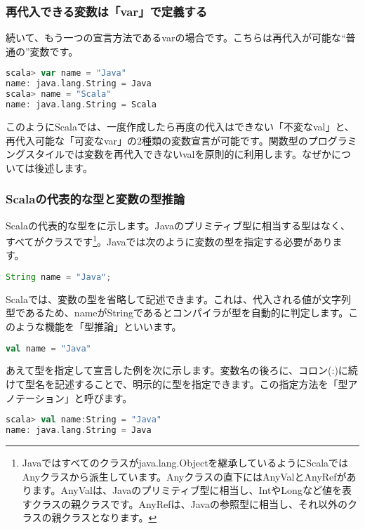 \subsubsection{再代入できる変数は「var」で定義する}
続いて、もう一つの宣言方法であるvarの場合です。こちらは再代入が可能な“普通の”変数です。

\begin{lstlisting}[language=scala, frame=none]
scala> var name = "Java"
name: java.lang.String = Java
scala> name = "Scala"
name: java.lang.String = Scala
\end{lstlisting}

このようにScalaでは、一度作成したら再度の代入はできない「不変なval」と、再代入可能な「可変なvar」の2種類の変数宣言が可能です。関数型のプログラミングスタイルでは変数を再代入できないvalを原則的に利用します。なぜかについては後述します。

\subsubsection{Scalaの代表的な型と変数の型推論}
Scalaの代表的な型をに示します。Javaのプリミティブ型に相当する型はなく、すべてがクラスです\footnote{Javaではすべてのクラスがjava.lang.Objectを継承しているようにScalaではAnyクラスから派生しています。Anyクラスの直下にはAnyValとAnyRefがあります。AnyValは、Javaのプリミティブ型に相当し、IntやLongなど値を表すクラスの親クラスです。AnyRefは、Javaの参照型に相当し、それ以外のクラスの親クラスとなります。}。Javaでは次のように変数の型を指定する必要があります。

\begin{lstlisting}[language=java, frame=none]
String name = "Java";
\end{lstlisting}

Scalaでは、変数の型を省略して記述できます。これは、代入される値が文字列型であるため、nameがStringであるとコンパイラが型を自動的に判定します。このような機能を「型推論」といいます。

\begin{lstlisting}[language=scala, frame=none]
val name = "Java"
\end{lstlisting}

あえて型を指定して宣言した例を次に示します。変数名の後ろに、コロン(:)に続けて型名を記述することで、明示的に型を指定できます。この指定方法を「型アノテーション」と呼びます。

\begin{lstlisting}[language=scala, frame=none]
scala> val name:String = "Java"
name: java.lang.String = Java
\end{lstlisting}

